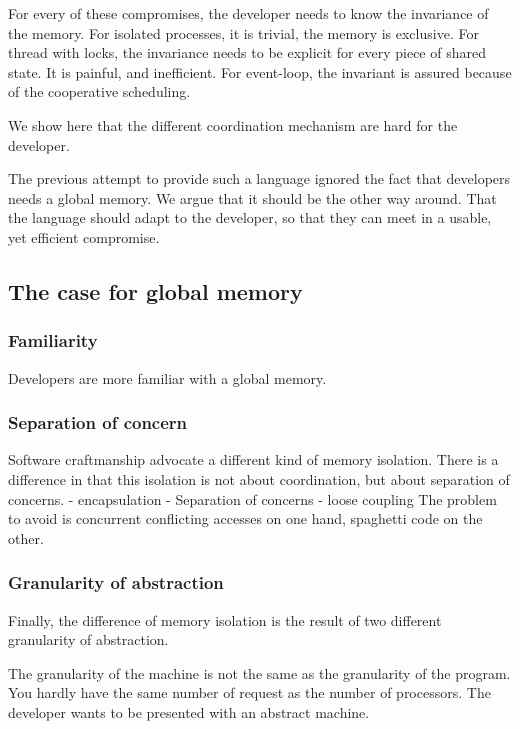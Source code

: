 For every of these compromises, the developer needs to know the invariance of the memory.
For isolated processes, it is trivial, the memory is exclusive.
For thread with locks, the invariance needs to be explicit for every piece of shared state. It is painful, and inefficient.
For event-loop, the invariant is assured because of the cooperative scheduling.

We show here that the different coordination mechanism are hard for the developer.

The previous attempt to provide such a language ignored the fact that developers needs a global memory. 
We argue that it should be the other way around.
That the language should adapt to the developer, so that they can meet in a usable, yet efficient compromise.


\subsection{The case for global memory}

\subsubsection{Familiarity}

Developers are more familiar with a global memory.

\subsubsection{Separation of concern}

Software craftmanship advocate a different kind of memory isolation.
There is a difference in that this isolation is not about coordination, but about separation of concerns.
- encapsulation
- Separation of concerns
- loose coupling
The problem to avoid is concurrent conflicting accesses on one hand, spaghetti code on the other.

\subsubsection{Granularity of abstraction}

Finally, the difference of memory isolation is the result of two different granularity of abstraction.

The granularity of the machine is not the same as the granularity of the program.
You hardly have the same number of request as the number of processors.
The developer wants to be presented with an abstract machine.

